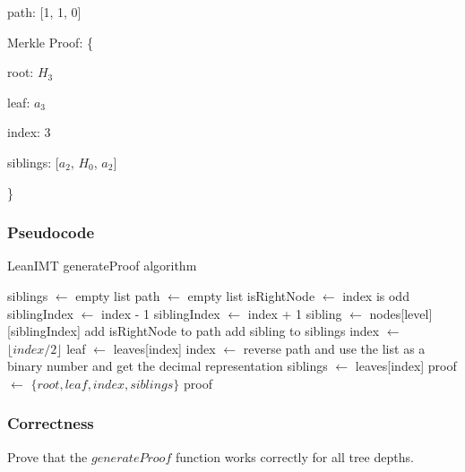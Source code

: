 \documentclass{article}
\begin{document}
path: [1, 1, 0]

Merkle Proof: \{

root: $H_3$

leaf: $a_3$

index: 3

siblings: [$a_2$, $H_0$, $a_2$]

\}

\subsubsection{Pseudocode}

\begin{algorithm}[H]
    \caption{LeanIMT generateProof algorithm}\label{generateProof}
    \begin{algorithmic}[1]
        \State siblings $\gets$ empty list 
        \State path $\gets$ empty list 
        \State isRightNode $\gets$ index is odd
         
        \State siblingIndex $\gets$ index - 1
        \Else {}
        \State siblingIndex $\gets$ index + 1
        \EndIf
        \State sibling $\gets$ nodes[level][siblingIndex]
        \State add isRightNode to path
        \State add sibling to siblings
        \EndIf
        \State index $\gets$ $\lfloor index/2 \rfloor$ 
        \EndFor
        \State leaf $\gets$ leaves[index]
        \State index $\gets$ reverse path and use the list as a binary number and get the decimal representation
        \State siblings $\gets$ leaves[index]
        \State proof $\gets$ $\{root, leaf , index, siblings \}$
        \State \Return proof
        \EndProcedure
    \end{algorithmic}
\end{algorithm}



\subsubsection{Correctness}

Prove that the $generateProof$ function works correctly for all tree depths.
\end{document}
